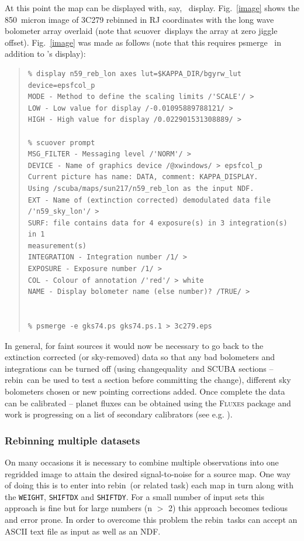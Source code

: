 \documentclass[twoside,11pt]{article}
\newcommand{\Kappa}{\xref{{\sc{Kappa}}}{sun95}{}}
\newcommand{\task}[1]{{\sf #1}}
\newcommand{\param}[1]{{\tt #1}}
\newcommand{\rebin}{\htmlref{\task{rebin}}{REBIN}}
\newcommand{\chgqual}{\htmlref{\task{change\_quality}}{CHANGE_QUALITY}}
\newcommand{\scuover}{\htmlref{\task{scuover}}{SCUOVER}}
\newcommand{\display}{\xref{\task{display}}{sun95}{DISPLAY}}
\newcommand{\psmerge}{\xref{\task{psmerge}}{sun164}{}}
\newenvironment{myquote}{\begin{quote}\begin{small}}{\end{small}\end{quote}}
\newcommand{\htmlref}[2]{#1}
\newcommand{\xref}[3]{#1}
\renewcommand{\_}{\texttt{\symbol{95}}}
\begin{document}
At this point the map can be displayed with, say, \Kappa\ \display. 
Fig.\ \ref{image} shows the 850~micron image of 3C279 rebinned in RJ
coordinates with the long wave bolometer array overlaid (note that 
\scuover\ displays the array at zero jiggle offset).
Fig.\ \ref{image} was made as follows (note that this requires
\psmerge\ \cite{psmerge} in addition to \Kappa's \display):

\begin{myquote}
\begin{verbatim}
% display n59_reb_lon axes lut=$KAPPA_DIR/bgyrw_lut device=epsfcol_p
MODE - Method to define the scaling limits /'SCALE'/ > 
LOW - Low value for display /-0.01095889788121/ > 
HIGH - High value for display /0.022901531308889/ >

% scuover prompt
MSG_FILTER - Messaging level /'NORM'/ > 
DEVICE - Name of graphics device /@xwindows/ > epsfcol_p
Current picture has name: DATA, comment: KAPPA_DISPLAY.
Using /scuba/maps/sun217/n59_reb_lon as the input NDF.
EXT - Name of (extinction corrected) demodulated data file /'n59_sky_lon'/ > 
SURF: file contains data for 4 exposure(s) in 3 integration(s) in 1
measurement(s)
INTEGRATION - Integration number /1/ > 
EXPOSURE - Exposure number /1/ > 
COL - Colour of annotation /'red'/ > white
NAME - Display bolometer name (else number)? /TRUE/ > 


% psmerge -e gks74.ps gks74.ps.1 > 3c279.eps
\end{verbatim}
\end{myquote}

In general, for faint sources it would now be necessary to go back to the
extinction corrected (or sky-removed) data so that any bad bolometers and
integrations can be turned off (using \chgqual\ and SCUBA sections -- \rebin\
can be used to test a section before committing the change), different sky
bolometers chosen or new pointing corrections added. Once complete the data
can be calibrated -- planet fluxes can be obtained using the \textsc{Fluxes}
package and work is progressing on a list of secondary calibrators
(see e.g. \cite{SECCAL}).


\subsubsection{Rebinning multiple datasets}
\label{batch}

On many occasions it is necessary to combine multiple observations into one
regridded image to attain the desired signal-to-noise for a source map. One
way of doing this is to enter into \rebin\ (or related task) each map in turn
along with the \param{WEIGHT}, \param{SHIFT\_DX} and \param{SHIFT\_DY}. For a
small number of input sets this approach is fine but for large numbers (n $>$
2) this approach becomes tedious and error prone.  In order to overcome this
problem the \rebin\ tasks can accept an ASCII text file as input as well as an
NDF.
\end{document}

